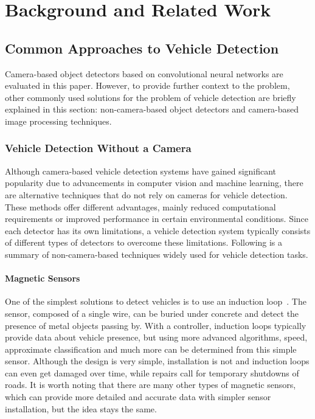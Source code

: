 \chapter{Background and Related Work}
\label{BackgroundAndRelatedWork}


\section{Common Approaches to Vehicle Detection}

Camera-based object detectors based on convolutional neural networks are
evaluated in this paper. However, to provide further context to the problem,
other commonly used solutions for the problem of vehicle detection are briefly
explained in this section: non-camera-based object detectors and
camera-based image processing techniques.


\subsection{Vehicle Detection Without a Camera}

Although camera-based vehicle detection systems have gained significant
popularity due to advancements in computer vision and machine learning, there
are alternative techniques that do not rely on cameras for vehicle detection.
These methods offer different advantages, mainly reduced computational
requirements or improved performance in certain environmental conditions. Since
each detector has its own limitations, a vehicle detection system typically
consists of different types of detectors to overcome these limitations.
Following is a summary of non-camera-based techniques widely used for vehicle
detection tasks.


\subsubsection*{Magnetic Sensors}

One of the simplest solutions to detect vehicles is to use an induction
loop~\cite{MagneticSensors}. The sensor, composed of a single wire, can be buried
under concrete and detect the presence of metal objects passing by. With a
controller, induction loops typically provide data about vehicle presence, but
using more advanced algorithms, speed, approximate classification and much more
can be determined from this simple sensor. Although the design is very simple,
installation is not and induction loops can even get damaged over time, while
repairs call for temporary shutdowns of roads. It is worth noting that there
are many other types of magnetic sensors, which can provide more detailed and
accurate data with simpler sensor installation, but the idea stays the same.


